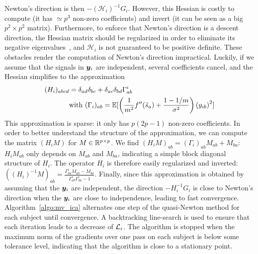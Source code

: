 Newton's direction is then $-\left(\mathcal{H}_i\right)^{-1}G_i$. However, this Hessian is costly to compute (it has $\simeq p^3$ non-zero coefficients) and invert (it can be seen as a big $p ^2\times p^2$ matrix). Furthermore, to enforce that Newton's direction is a descent direction, the Hessian matrix should be regularized in order to eliminate its negative eigenvalues~\cite{nocedal2006numerical}, and $\mathcal{H}_i$ is not guaranteed to be positive definite.
%
These obstacles render the computation of Newton's direction impractical.
%
Luckily, if we assume that the signals in $\boldsymbol{y}_i$ are independent, several coefficients cancel, and the Hessian simplifies to the approximation
\begin{align}
    \label{eq:hessian_approx}
    (H_i)_{abcd} &= \delta_{ad}\delta_{bc} + \delta_{ac}\delta_{bd}\Gamma^i_{ab} \\
    &\text{with  }(\Gamma_i)_{ab} = \mathbb{E}[\left(\frac{1}{m^2}f''(\tilde{s}_a) + \frac{1 - 1/m}{\sigma^2}\right)\left(y_{ib}\right)^2] \nonumber
\end{align}
This approximation is sparse: it only has $p(2p -1)$ non-zero coefficients.
%
In order to better understand the structure of the approximation, we can compute the matrix $\left(H_iM\right)$ for $M\in \mathbb{R}^{p\times p}$. 
%
We find $\left(H_iM\right)_{ab} = (\Gamma_i)_{ab}M_{ab} + M_{ba}$: $H_iM_{ab}$ only depends on $M_{ab}$ and $M_{ba}$, indicating a simple block diagonal structure of $H_i$.
%
The operator $H_i$ is therefore easily regularized and inverted:
$\left((H_i)^{-1}M\right)_{ab} = \frac{\Gamma^i_{ba}M_{ab} - M_{ba}}{\Gamma^i_{ab}\Gamma^i_{ba} - 1}$.
%
Finally, since this approximation is obtained by assuming that the $\boldsymbol{y}_i$ are independent, the direction $-H_i^{-1}G_i$ is close to Newton's direction when the $\boldsymbol{y}_i$ are close to independence, leading to fast convergence.
%
Algorithm~\ref{algo:mv_ica} alternates one step of the quasi-Newton method for each subject until convergence.
%
A backtracking line-search is used to ensure that each iteration leads to a decrease of $\mathcal{L}_i$.
%
The algorithm is stopped when the maximum norm of the gradients over one pass on each subject is below some tolerance level, indicating that the algorithm is close to a stationary point.

